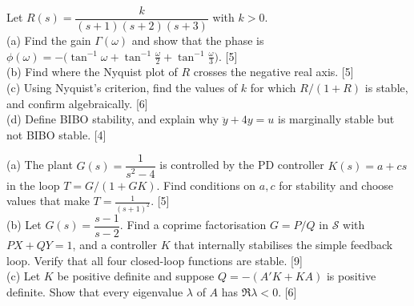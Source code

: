 \begin{qbox}[title={M4 (Chapter 4 and Nyquist) [20 marks]}]
Let $R(s)=\dfrac{k}{(s+1)(s+2)(s+3)}$ with $k>0$.\\
(a) Find the gain $\Gamma(\omega)$ and show that the phase is $\phi(\omega)=-\big(\tan^{-1}\omega+\tan^{-1}\frac\omega2+\tan^{-1}\frac\omega3\big)$. [5]\\
(b) Find where the Nyquist plot of $R$ crosses the negative real axis. [5]\\
(c) Using Nyquist's criterion, find the values of $k$ for which $R/(1+R)$ is stable, and confirm algebraically. [6]\\
(d) Define BIBO stability, and explain why $\ddot y+4y=u$ is marginally stable but not BIBO stable. [4]
\end{qbox}
\begin{qbox}[title={M5 (Chapter 5) [20 marks]}]
(a) The plant $G(s)=\dfrac{1}{s^2-4}$ is controlled by the PD controller $K(s)=a+cs$ in the loop $T=G/(1+GK)$. Find conditions on $a,c$ for stability and choose values that make $T=\frac{1}{(s+1)^2}$. [5]\\
(b) Let $G(s)=\dfrac{s-1}{s-2}$. Find a coprime factorisation $G=P/Q$ in $\mathcal S$ with $PX+QY=1$, and a controller $K$ that internally stabilises the simple feedback loop. Verify that all four closed-loop functions are stable. [9]\\
(c) Let $K$ be positive definite and suppose $Q=-(A'K+KA)$ is positive definite. Show that every eigenvalue $\lambda$ of $A$ has $\Re\lambda<0$. [6]
\end{qbox}

